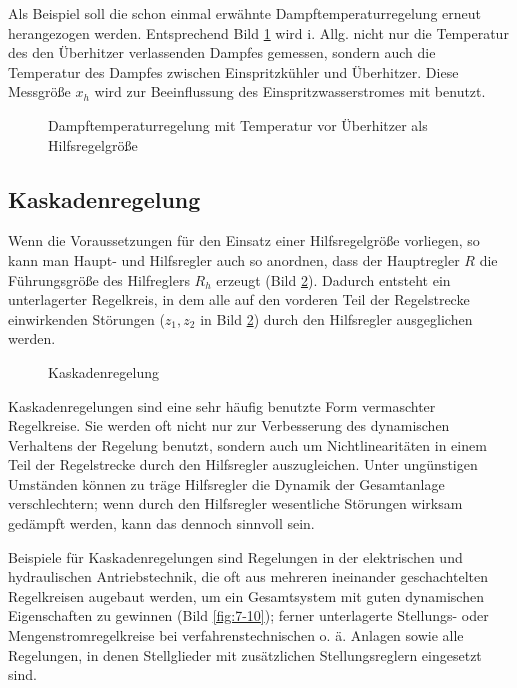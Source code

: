 Als Beispiel soll die schon einmal erwähnte Dampftemperaturregelung erneut herangezogen werden.
Entsprechend Bild \ref{fig:7-8} wird i. Allg. nicht nur die Temperatur des den Überhitzer verlassenden Dampfes gemessen, sondern auch die Temperatur des Dampfes zwischen Einspritzkühler und Überhitzer.
Diese Messgröße \(x_h\) wird zur Beeinflussung des Einspritzwasserstromes mit benutzt.

\begin{figure}[ht]
    \centering
    \caption{Dampftemperaturregelung mit Temperatur vor Überhitzer als Hilfsregelgröße}
    \label{fig:7-8}
\end{figure}


\subsection{Kaskadenregelung}

Wenn die Voraussetzungen für den Einsatz einer Hilfsregelgröße vorliegen, so kann man Haupt- und Hilfsregler auch so anordnen, dass der Hauptregler \(R\) die Führungsgröße des Hilfreglers \(R_h\) erzeugt (Bild \ref{fig:7-9}).
Dadurch entsteht ein unterlagerter Regelkreis, in dem alle auf den vorderen Teil der Regelstrecke einwirkenden Störungen (\(z_1, z_2\) in Bild \ref{fig:7-9}) durch den Hilfsregler ausgeglichen werden.

\begin{figure}[ht]
    \centering
    \caption{Kaskadenregelung}
    \label{fig:7-9}
\end{figure}

Kaskadenregelungen sind eine sehr häufig benutzte Form vermaschter Regelkreise.
Sie werden oft nicht nur zur Verbesserung des dynamischen Verhaltens der Regelung benutzt, sondern auch um Nichtlinearitäten in einem Teil der Regelstrecke durch den Hilfsregler auszugleichen.
Unter ungünstigen Umständen können zu träge Hilfsregler die Dynamik der Gesamtanlage verschlechtern; wenn durch den Hilfsregler wesentliche Störungen wirksam gedämpft werden, kann das dennoch sinnvoll sein.

Beispiele für Kaskadenregelungen sind Regelungen in der elektrischen und hydraulischen Antriebstechnik, die oft aus mehreren ineinander geschachtelten Regelkreisen augebaut werden, um ein Gesamtsystem mit guten dynamischen Eigenschaften zu gewinnen (Bild \ref{fig:7-10}); ferner unterlagerte Stellungs- oder Mengenstromregelkreise bei verfahrenstechnischen o. ä. Anlagen sowie alle Regelungen, in denen Stellglieder mit zusätzlichen Stellungsreglern eingesetzt sind.

